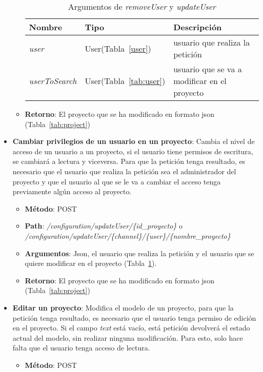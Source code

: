 \begin{itemize}
\begin{itemize}
\begin{table}[h]
		\begin{tabular}{lll}
		\textbf{Nombre}  & \textbf{Tipo} & \textbf{Descripción}                                 \\ \hline \hline
		\textit{user} & User(Tabla~\ref{user}) & usuario que realiza la petición\\
		\textit{userToSearch} & User(Tabla~\ref{tab:user}) & usuario que se va a modificar en el proyecto\\ \hline
		\end{tabular}
		\caption{Argumentos de \textit{removeUser} y \textit{updateUser}}
		\label{tab:removeUser}
		\end{table}
	\item \textbf{Retorno}: El proyecto que se ha modificado en formato json (Tabla~\ref{tab:project})	
	\end{itemize}
\item \textbf{Cambiar privilegios de un usuario en un proyecto}: Cambia el nivel de acceso de un usuario a un proyecto, si el usuario tiene permisos de escritura, se cambiará a lectura y viceversa. Para que la petición tenga resultado, es necesario que el usuario que realiza la petición sea el administrador del proyecto y que el usuario al que se le va a cambiar el acceso tenga previamente algún acceso al proyecto. 
	\begin{itemize}
	\item \textbf{Método}: POST
	\item \textbf{Path}: \textit{/configuration/updateUser/\{id\_proyecto\}} o\\ \textit{/configuration/updateUser/\{channel\}/\{user\}/\{nombre\_proyecto\}}
	\item \textbf{Argumentos}: Json, el usuario que realiza la petición y el usuario que se quiere modificar en el proyecto (Tabla~\ref{tab:removeUser}).\\
	\item \textbf{Retorno}: El proyecto que se ha modificado en formato json (Tabla~\ref{tab:project})		
	\end{itemize}
\item \textbf{Editar un proyecto}: Modifica el modelo de un proyecto, para que la petición tenga resultado, es necesario que el usuario tenga permiso de edición en el proyecto. Si el campo \textit{text} está vacío, está petición devolverá el estado actual del modelo, sin realizar ninguna modificación. Para esto, solo hace falta que el usuario tenga acceso de lectura.
	\begin{itemize}
	\item \textbf{Método}: POST

\end{itemize}
\end{itemize}
